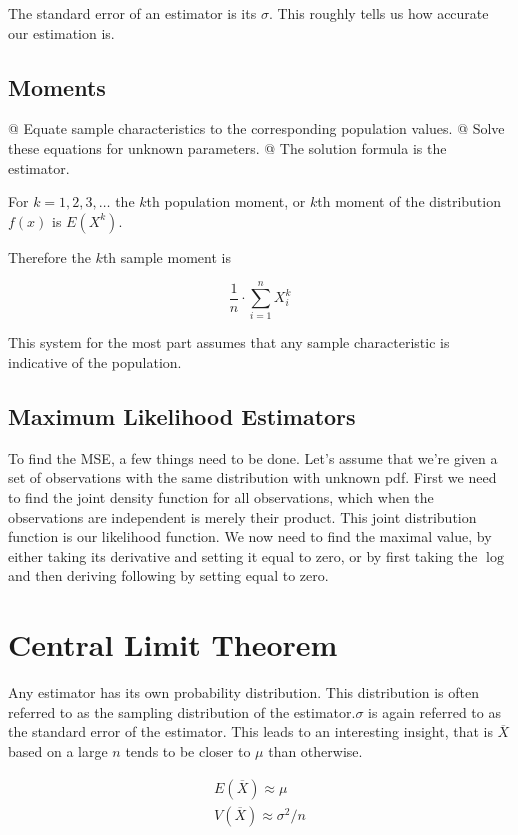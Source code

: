 The standard error of an estimator is its $\sigma$. This roughly tells us how accurate our estimation is.

    \subsection{Moments}
    \NewList
    \begin{easylist}
        @ Equate sample characteristics to the corresponding population values.
        @ Solve these equations for unknown parameters.
        @ The solution formula is the estimator.
    \end{easylist}

    For $k = 1, 2, 3, \ldots$ the $k$th population moment, or $k$th moment of the distribution $f(x)$ is $E(X^k)$.

    Therefore the $k$th sample moment is

    \[
        \frac{1}{n} \cdot \sum_{i=1}^n X^k_i
    \]

    This system for the most part assumes that any sample characteristic is indicative of the population.

    \subsection{Maximum Likelihood Estimators}
    To find the MSE, a few things need to be done. Let's assume that we're given a set of observations with the same
    distribution with unknown pdf. First we need to find the joint density function for all observations, which when the
    observations are independent is merely their product. This joint distribution function is our likelihood function.
    We now need to find the maximal value, by either taking its derivative and setting it equal to zero, or by first
    taking the $\log$ and then deriving following by setting equal to zero.

\section{Central Limit Theorem}
Any estimator has its own probability distribution. This distribution is often referred to as the sampling distribution
of the estimator.$\sigma$ is again referred to as the standard error of the estimator. This leads to an interesting
insight, that is $\overline{X}$ based on a large $n$ tends to be closer to $\mu$ than otherwise.

    \[
        \begin{aligned}
            E(\overline{X}) \approx \mu\\
            V(\overline{X}) \approx \sigma^2 / n
        \end{aligned}
    \]

